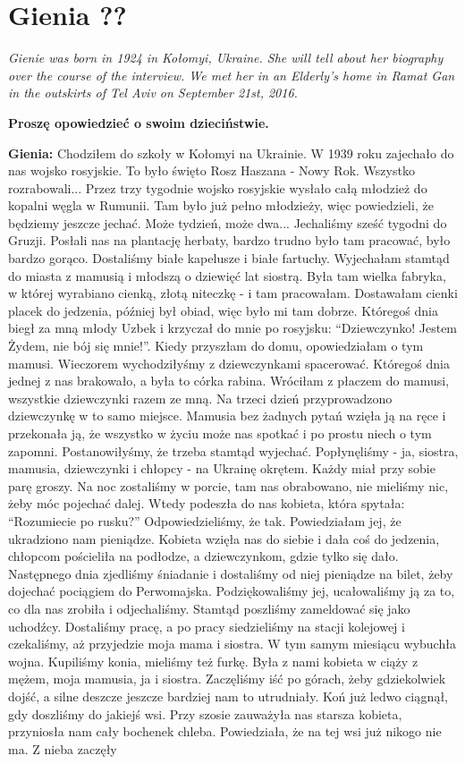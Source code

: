 \section{Gienia ??}
\begin{otherlanguage}{polish}
\textit{Gienie was born in 1924 in Kołomyi, Ukraine. She will tell about her biography over the course of the interview. We met her in an Elderly’s home in Ramat Gan in the outskirts of Tel Aviv on September 21st, 2016.}\par
\vspace*{2em}
\textbf{Proszę opowiedzieć o swoim dzieciństwie.}

\textbf{Gienia:} Chodziłem do szkoły w Kołomyi na Ukrainie. W 1939 roku zajechało do nas wojsko rosyjskie. To było święto Rosz Haszana - Nowy Rok. Wszystko rozrabowali... Przez trzy tygodnie wojsko rosyjskie wysłało całą młodzież do kopalni węgla w Rumunii. Tam było już pełno młodzieży, więc powiedzieli, że będziemy jeszcze jechać. Może tydzień, może dwa... Jechaliśmy sześć tygodni do Gruzji. Posłali nas na plantację herbaty, bardzo trudno było tam pracować, było bardzo gorąco. Dostaliśmy białe kapelusze i białe fartuchy. Wyjechałam stamtąd do miasta z mamusią i młodszą o dziewięć lat siostrą. Była tam wielka fabryka, w której wyrabiano cienką, złotą niteczkę - i tam pracowałam. Dostawałam cienki placek do jedzenia, później był obiad, więc było mi tam dobrze. Któregoś dnia biegł za mną młody Uzbek i krzyczał do mnie po rosyjsku: "`Dziewczynko! Jestem Żydem, nie bój się mnie!"'. Kiedy przyszłam do domu, opowiedziałam o tym mamusi. Wieczorem wychodziłyśmy z dziewczynkami spacerować. Któregoś dnia jednej z nas brakowało, a była to córka rabina. Wróciłam z płaczem do mamusi, wszystkie dziewczynki razem ze mną. Na trzeci dzień przyprowadzono dziewczynkę w to samo miejsce. Mamusia bez żadnych pytań wzięła ją na ręce i przekonała ją, że wszystko w życiu może nas spotkać i po prostu niech o tym zapomni. Postanowiłyśmy, że trzeba stamtąd wyjechać. Popłynęliśmy - ja, siostra, mamusia, dziewczynki i chłopcy - na Ukrainę okrętem. Każdy miał przy sobie parę groszy. Na noc zostaliśmy w porcie, tam nas obrabowano, nie mieliśmy nic, żeby móc pojechać dalej. Wtedy podeszła do nas kobieta, która spytała: "`Rozumiecie po rusku?"' Odpowiedzieliśmy, że tak. Powiedziałam jej, że ukradziono nam pieniądze. Kobieta wzięła nas do siebie i dała coś do jedzenia, chłopcom pościeliła na podłodze, a dziewczynkom, gdzie tylko się dało. Następnego dnia zjedliśmy śniadanie i dostaliśmy od niej pieniądze na bilet, żeby dojechać pociągiem do Perwomajska. Podziękowaliśmy jej, ucałowaliśmy ją za to, co dla nas zrobiła i odjechaliśmy. Stamtąd poszliśmy zameldować się jako uchodźcy. Dostaliśmy pracę, a po pracy siedzieliśmy na stacji kolejowej i czekaliśmy, aż przyjedzie moja mama i siostra. W tym samym miesiącu wybuchła wojna. Kupiliśmy konia, mieliśmy też furkę. Była z nami kobieta w ciąży z mężem, moja mamusia, ja i siostra. Zaczęliśmy iść po górach, żeby gdziekolwiek dojść, a silne deszcze jeszcze bardziej nam to utrudniały. Koń już ledwo ciągnął, gdy doszliśmy do jakiejś wsi. Przy szosie zauważyła nas starsza kobieta, przyniosła nam cały bochenek chleba. Powiedziała, że na tej wsi już nikogo nie ma. Z nieba zaczęły 
\end{otherlanguage}
